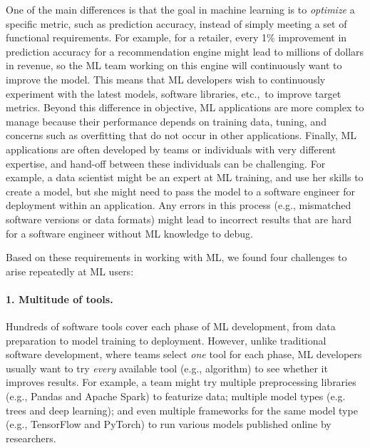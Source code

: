 \documentclass[11pt]{article}
\begin{document}
One of the main differences is that the goal in machine learning is to \emph{optimize} a specific metric, such as prediction accuracy, instead of simply meeting a set of functional requirements.
For example, for a retailer, every 1\% improvement in prediction accuracy for a recommendation engine might lead to millions of dollars in revenue, so the ML team working on this engine will continuously want to improve the model.
This means that ML developers wish to continuously experiment with the latest models, software libraries, etc.,~to improve target metrics.
Beyond this difference in objective, ML applications are more complex to manage because their performance depends on training data, tuning, and concerns such as overfitting that do not occur in other applications.
Finally, ML applications are often developed by teams or individuals with very different expertise, and hand-off between these individuals can be challenging.
For example, a data scientist might be an expert at ML training, and use her skills to create a model, but she might need to pass the model to a software engineer for deployment within an application.
Any errors in this process (e.g., mismatched software versions or data formats) might lead to incorrect results that are hard for a software engineer without ML knowledge to debug.

Based on these requirements in working with ML, we found four challenges to arise repeatedly at ML users:

\vspace{-0.6em}
\paragraph{1. Multitude of tools.} Hundreds of software tools cover each phase of ML development, from data preparation to model training to deployment. However, unlike traditional software development, where teams select \emph{one} tool for each phase, ML developers usually want to try \emph{every} available tool (e.g., algorithm) to see whether it improves results. For example, a team might try multiple preprocessing libraries (e.g., Pandas and Apache Spark) to featurize data; multiple model types (e.g. trees and deep learning); and even multiple frameworks for the same model type (e.g., TensorFlow and PyTorch) to run various models published online by researchers. %
\end{document}
